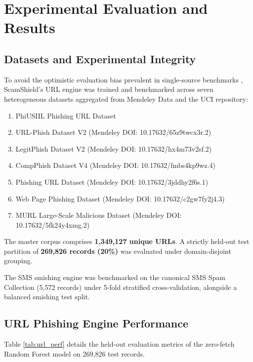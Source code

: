 \documentclass[conference]{IEEEtran}
\begin{document}
\section{Experimental Evaluation and Results}

\subsection{Datasets and Experimental Integrity}
To avoid the optimistic evaluation bias prevalent in single-source benchmarks \cite{prasad2024phiusiil}, ScamShield's URL engine was trained and benchmarked across seven heterogeneous datasets aggregated from Mendeley Data and the UCI repository:
\begin{enumerate}
    \item PhiUSIIL Phishing URL Dataset \cite{prasad2024phiusiil}
    \item URL-Phish Dataset V2 (Mendeley DOI: 10.17632/65z9twcx3r.2)
    \item LegitPhish Dataset V2 (Mendeley DOI: 10.17632/hx4m73v2sf.2)
    \item CompPhish Dataset V4 (Mendeley DOI: 10.17632/fmbs4kp9wz.4)
    \item Phishing URL Dataset (Mendeley DOI: 10.17632/3jddhy2f6s.1)
    \item Web Page Phishing Dataset (Mendeley DOI: 10.17632/c2gw7fy2j4.3)
    \item MURL Large-Scale Malicious Dataset (Mendeley DOI: 10.17632/5fk24y4xmg.2)
\end{enumerate}

The master corpus comprises \textbf{1,349,127 unique URLs}. A strictly held-out test partition of \textbf{269,826 records (20\%)} was evaluated under domain-disjoint grouping.

The SMS smishing engine was benchmarked on the canonical SMS Spam Collection \cite{almeida2011contributions} (5,572 records) under 5-fold stratified cross-validation, alongside a balanced smishing test split.

\subsection{URL Phishing Engine Performance}
Table \ref{tab:url_perf} details the held-out evaluation metrics of the zero-fetch Random Forest model on 269,826 test records.
\end{document}
